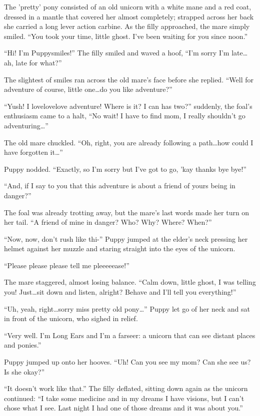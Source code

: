 The 'pretty' pony consisted of an old unicorn with a white mane and a red coat, dressed in a mantle that covered her almost completely; strapped across her back she carried a long lever action carbine. As the filly approached, the mare simply smiled. ``You took your time, little ghost. I've been waiting for you since noon.''

``Hi! I'm Puppysmiles!'' The filly smiled and waved a hoof, ``I'm sorry I'm late\dots ah, late for what?''

The slightest of smiles ran across the old mare's face before she replied. ``Well for adventure of course, little one\dots do you like adventure?''

``Yush! I lovelovelove adventure! Where is it? I can has two?'' suddenly, the foal's enthusiasm came to a halt, ``No wait! I have to find mom, I really shouldn't go adventuring\dots''

The old mare chuckled. ``Oh, right, you are already following a path\dots how could I have forgotten it\dots''

Puppy nodded. ``Exactly, so I'm sorry but I've got to go, 'kay thanks bye bye!''

``And, if I say to you that this adventure is about a friend of yours being in danger?''

The foal was already trotting away, but the mare's last words made her turn on her tail. ``A friend of mine in danger? Who? Why? Where? When?''

``Now, now, don't rush like thi-'' Puppy jumped at the elder's neck pressing her helmet against her muzzle and staring straight into the eyes of the unicorn.

``Please please please tell me pleeeeease!''

The mare staggered, almost losing balance. ``Calm down, little ghost, I was telling you! Just\dots sit down and listen, alright? Behave and I'll tell you everything!''

``Uh, yeah, right\dots sorry miss pretty old pony\dots'' Puppy let go of her neck and sat in front of the unicorn, who sighed in relief.

``Very well. I'm Long Ears and I'm a farseer: a unicorn that can see distant places and ponies.''

Puppy jumped up onto her hooves. ``Uh! Can you see my mom? Can she see us? Is she okay?''

``It doesn't work like that.'' The filly deflated, sitting down again as the unicorn continued: ``I take some medicine and in my dreams I have visions, but I can't chose what I see. Last night I had one of those dreams and it was about you.''

